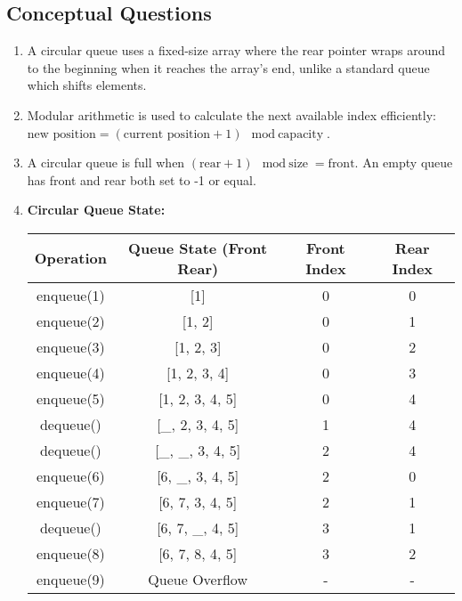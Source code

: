 \documentclass[12pt]{article}
\begin{document}
\subsection*{Conceptual Questions}
\begin{enumerate}
    \item A circular queue uses a fixed-size array where the rear pointer wraps around to the beginning when it reaches the array’s end, unlike a standard queue which shifts elements.
    
    \item Modular arithmetic is used to calculate the next available index efficiently: $\text{new position} = (\text{current position} + 1) \mod \text{capacity}$.
    
    \item A circular queue is full when $(\text{rear} + 1) \mod \text{size} = \text{front}$. An empty queue has front and rear both set to -1 or equal.
    
    \item \textbf{Circular Queue State:}
    \begin{tabular}{|c|c|c|c|}
    \hline
    Operation & Queue State (Front \textrightarrow{} Rear) & Front Index & Rear Index \\
    \hline
    enqueue(1) & [1] & 0 & 0 \\
    enqueue(2) & [1, 2] & 0 & 1 \\
    enqueue(3) & [1, 2, 3] & 0 & 2 \\
    enqueue(4) & [1, 2, 3, 4] & 0 & 3 \\
    enqueue(5) & [1, 2, 3, 4, 5] & 0 & 4 \\ 
    dequeue() & [_, 2, 3, 4, 5] & 1 & 4 \\
    dequeue() & [_, _, 3, 4, 5] & 2 & 4 \\
    enqueue(6) & [6, _, 3, 4, 5] & 2 & 0 \\
    enqueue(7) & [6, 7, 3, 4, 5] & 2 & 1 \\
    dequeue() & [6, 7, _, 4, 5] & 3 & 1 \\
    enqueue(8) & [6, 7, 8, 4, 5] & 3 & 2 \\
    enqueue(9) & Queue Overflow & - & - \\
    \hline
    \end{tabular}
    

\end{enumerate}
\end{document}
